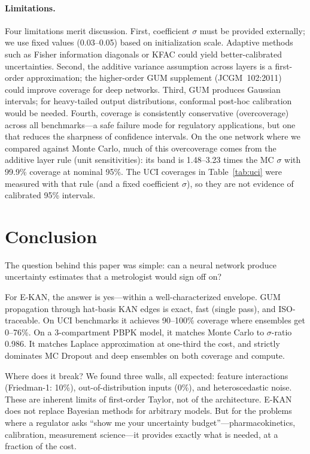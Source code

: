 \documentclass{article}
\begin{document}
\paragraph{Limitations.}
Four limitations merit discussion.  First, coefficient $\sigma$ must be
provided externally; we use fixed values (0.03--0.05) based on initialization
scale.  Adaptive methods such as Fisher information diagonals or KFAC could
yield better-calibrated uncertainties.  Second, the additive variance
assumption across layers is a first-order approximation; the higher-order GUM
supplement (JCGM~102:2011)~\citep{gum2011supplement} could improve coverage
for deep networks.  Third, GUM produces Gaussian intervals; for heavy-tailed
output distributions, conformal post-hoc calibration would be needed.
Fourth, coverage is consistently conservative (overcoverage) across all
benchmarks---a safe failure mode for regulatory applications, but one that
reduces the sharpness of confidence intervals.  On the one network where we
compared against Monte Carlo, much of this overcoverage comes from the
additive layer rule (unit sensitivities): its band is 1.48--3.23 times the
MC $\sigma$ with 99.9\% coverage at nominal 95\%.  The UCI coverages in
Table~\ref{tab:uci} were measured with that rule (and a fixed coefficient
$\sigma$), so they are not evidence of calibrated 95\% intervals.

\section{Conclusion}
\label{sec:conclusion}

The question behind this paper was simple: can a neural network produce
uncertainty estimates that a metrologist would sign off on?

For E-KAN, the answer is yes---within a well-characterized envelope.
GUM propagation through hat-basis KAN edges is exact, fast (single pass),
and ISO-traceable.  On UCI benchmarks it achieves 90--100\% coverage where
ensembles get 0--76\%.  On a 3-compartment PBPK model, it matches
Monte Carlo to $\sigma$-ratio 0.986.  It matches Laplace approximation
at one-third the cost, and strictly dominates MC Dropout and deep ensembles
on both coverage and compute.

Where does it break?  We found three walls, all expected:
feature interactions (Friedman-1: 10\%), out-of-distribution inputs (0\%),
and heteroscedastic noise.  These are inherent limits of first-order Taylor,
not of the architecture.  E-KAN does not replace Bayesian methods for
arbitrary models.  But for the problems where a regulator asks ``show me
your uncertainty budget''---pharmacokinetics, calibration, measurement
science---it provides exactly what is needed, at a fraction of the cost.
\end{document}
